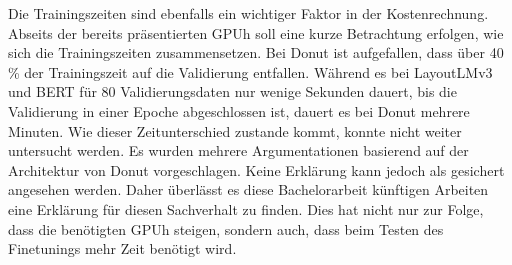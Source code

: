 Die Trainingszeiten sind ebenfalls ein wichtiger Faktor in der Kostenrechnung. Abseits der bereits präsentierten GPUh soll eine kurze Betrachtung erfolgen, wie sich die Trainingszeiten zusammensetzen. Bei Donut ist aufgefallen, dass über 40 \% der Trainingszeit auf die Validierung entfallen. Während es bei LayoutLMv3 und BERT für 80 Validierungsdaten nur wenige Sekunden dauert, bis die Validierung in einer Epoche abgeschlossen ist, dauert es bei Donut mehrere Minuten. Wie dieser Zeitunterschied zustande kommt, konnte nicht weiter untersucht werden. Es wurden mehrere Argumentationen basierend auf der Architektur von Donut vorgeschlagen. Keine Erklärung kann jedoch als gesichert angesehen werden. Daher überlässt es diese Bachelorarbeit künftigen Arbeiten eine Erklärung für diesen Sachverhalt zu finden. Dies hat nicht nur zur Folge, dass die benötigten GPUh steigen, sondern auch, dass beim Testen des Finetunings mehr Zeit benötigt wird. 

